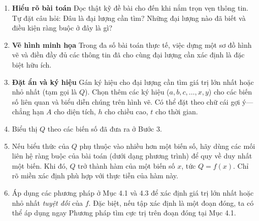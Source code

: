 \documentclass[10pt]{article}
\begin{document}
\begin{minipage}[t]{0.70\textwidth}
  \vspace{0.8em}
  \begin{tcolorbox}[
    colback=boxbg,
    colframe=boxpurple,
    arc=0mm,
    boxrule=1pt,
    left=8pt,right=8pt,top=6pt,bottom=6pt,
    coltitle=white,
    title={\textbf{Các bước giải bài toán tối ưu hóa}},
    fonttitle=\bfseries\sffamily
  ]
    \begin{enumerate}[label=\bfseries\arabic*.,leftmargin=1.5em,itemsep=0.45em]
      \item \textbf{Hiểu rõ bài toán} \quad Đọc thật kỹ đề bài cho đến khi nắm trọn vẹn thông tin. Tự đặt câu hỏi: Đâu là đại lượng cần tìm? Những đại lượng nào đã biết và điều kiện ràng buộc ở đây là gì?
      \item \textbf{Vẽ hình minh họa} \quad Trong đa số bài toán thực tế, việc dựng một sơ đồ hình vẽ và điền đầy đủ các thông tin đã cho cùng đại lượng cần xác định là đặc biệt hữu ích.
      \item \textbf{Đặt ẩn và ký hiệu} \quad Gán ký hiệu cho đại lượng cần tìm giá trị lớn nhất hoặc nhỏ nhất (tạm gọi là $Q$). Chọn thêm các ký hiệu ($a, b, c, \dots, x, y$) cho các biến số liên quan và biểu diễn chúng trên hình vẽ. Có thể đặt theo chữ cái gợi ý---chẳng hạn $A$ cho diện tích, $h$ cho chiều cao, $t$ cho thời gian.
      \item Biểu thị $Q$ theo các biến số đã đưa ra ở Bước 3.
      \item Nếu biểu thức của $Q$ phụ thuộc vào nhiều hơn một biến số, hãy dùng các mối liên hệ ràng buộc của bài toán (dưới dạng phương trình) để quy về duy nhất một biến. Khi đó, $Q$ trở thành hàm của một biến số $x$, tức $Q = f(x)$. Chỉ rõ miền xác định phù hợp với thực tiễn của hàm này.
      \item Áp dụng các phương pháp ở Mục 4.1 và 4.3 để xác định giá trị lớn nhất hoặc nhỏ nhất \textit{tuyệt đối} của $f$. Đặc biệt, nếu tập xác định là một đoạn đóng, ta có thể áp dụng ngay Phương pháp tìm cực trị trên đoạn đóng tại Mục 4.1.
    \end{enumerate}
  \end{tcolorbox}
\end{minipage}
\end{document}
